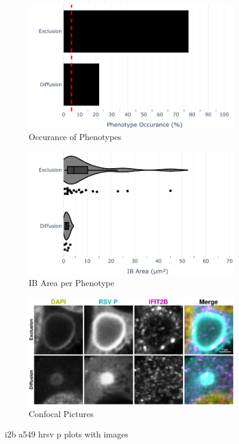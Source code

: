 \begin{figure}
    \begin{subfigure}{0.5\textwidth}
        \includegraphics[width=1\linewidth]{10. Chapter 5/Figs/01. Infection/02. IFIT2B/04. bar_i2b_a549-p.pdf} 
        \caption[]{Occurance of Phenotypes}
    \end{subfigure}
    \begin{subfigure}{0.5\textwidth}
        \includegraphics[width=1\linewidth]{10. Chapter 5/Figs/01. Infection/02. IFIT2B/05. violin_i2b_a549-p.pdf}
        \caption[]{IB Area per Phenotype}
    \end{subfigure}

    \begin{subfigure}{1\textwidth}
        \includegraphics[width=1\linewidth]{10. Chapter 5/Figs/01. Infection/02. IFIT2B/06. i2b a549 hrsv p.pdf} 
        \caption[]{Confocal Pictures}
    \end{subfigure}
    \caption[i2b a549 hrsv p plots with images]{i2b a549 hrsv p plots with images}
    \label{fig:i2b a549 hrsv p plots with images}
\end{figure}

